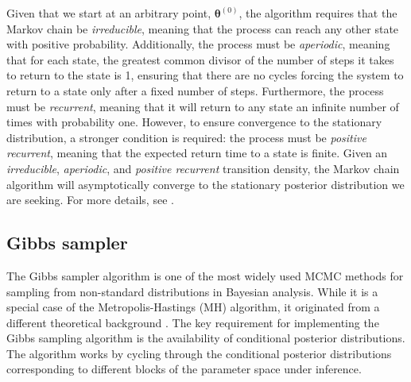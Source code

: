 Given that we start at an arbitrary point, $\bm{\theta}^{(0)}$, the algorithm requires that the Markov chain be \textit{irreducible}, meaning that the process can reach any other state with positive probability. Additionally, the process must be \textit{aperiodic}, meaning that for each state, the greatest common divisor of the number of steps it takes to return to the state is 1, ensuring that there are no cycles forcing the system to return to a state only after a fixed number of steps. Furthermore, the process must be \textit{recurrent}, meaning that it will return to any state an infinite number of times with probability one. However, to ensure convergence to the stationary distribution, a stronger condition is required: the process must be \textit{positive recurrent}, meaning that the expected return time to a state is finite. Given an \textit{irreducible}, \textit{aperiodic}, and \textit{positive recurrent} transition density, the Markov chain algorithm will asymptotically converge to the stationary posterior distribution we are seeking. For more details, see \cite[chap.~6]{robert2011monte}.
   
\subsection{Gibbs sampler}\label{sec511}

The Gibbs sampler algorithm is one of the most widely used MCMC methods for sampling from non-standard distributions in Bayesian analysis. While it is a special case of the Metropolis-Hastings (MH) algorithm, it originated from a different theoretical background \cite{Geman1984,Gelfand1990}. The key requirement for implementing the Gibbs sampling algorithm is the availability of conditional posterior distributions. The algorithm works by cycling through the conditional posterior distributions corresponding to different blocks of the parameter space under inference.

